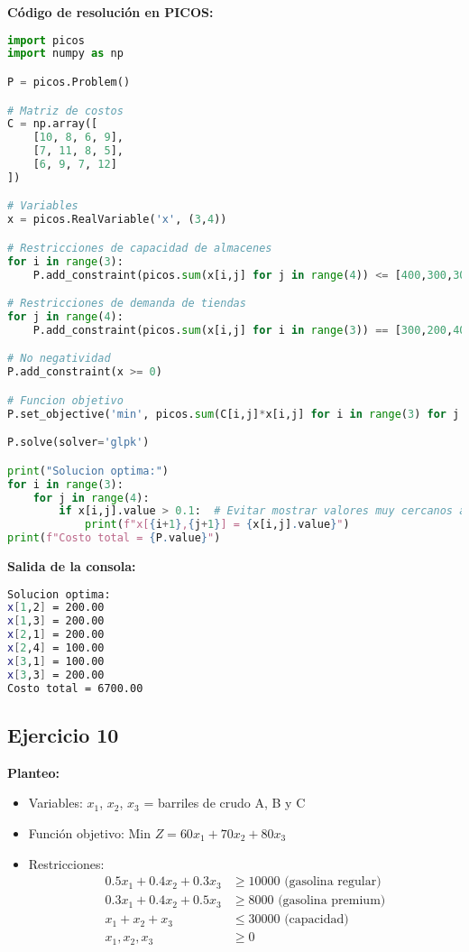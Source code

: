 \documentclass[12pt]{article}
\begin{document}
\textbf{Código de resolución en PICOS:}
\begin{lstlisting}[language=Python]
import picos
import numpy as np

P = picos.Problem()

# Matriz de costos
C = np.array([
    [10, 8, 6, 9],
    [7, 11, 8, 5],
    [6, 9, 7, 12]
])

# Variables
x = picos.RealVariable('x', (3,4))

# Restricciones de capacidad de almacenes
for i in range(3):
    P.add_constraint(picos.sum(x[i,j] for j in range(4)) <= [400,300,300][i])

# Restricciones de demanda de tiendas
for j in range(4):
    P.add_constraint(picos.sum(x[i,j] for i in range(3)) == [300,200,400,100][j])

# No negatividad
P.add_constraint(x >= 0)

# Funcion objetivo
P.set_objective('min', picos.sum(C[i,j]*x[i,j] for i in range(3) for j in range(4)))

P.solve(solver='glpk')

print("Solucion optima:")
for i in range(3):
    for j in range(4):
        if x[i,j].value > 0.1:  # Evitar mostrar valores muy cercanos a cero
            print(f"x[{i+1},{j+1}] = {x[i,j].value}")
print(f"Costo total = {P.value}")
\end{lstlisting}

\textbf{Salida de la consola:}
\begin{lstlisting}[language=bash,backgroundcolor=\color{black},basicstyle=\color{white}\ttfamily,numbers=none]
Solucion optima:
x[1,2] = 200.00
x[1,3] = 200.00
x[2,1] = 200.00
x[2,4] = 100.00
x[3,1] = 100.00
x[3,3] = 200.00
Costo total = 6700.00
\end{lstlisting}

\subsection*{Ejercicio 10}

\textbf{Planteo:}
\begin{itemize}
\item Variables: $x_1$, $x_2$, $x_3$ = barriles de crudo A, B y C
\item Función objetivo: Min $Z = 60x_1 + 70x_2 + 80x_3$
\item Restricciones:
  \begin{align*}
  0.5x_1 + 0.4x_2 + 0.3x_3 &\geq 10000 \text{ (gasolina regular)} \\
  0.3x_1 + 0.4x_2 + 0.5x_3 &\geq 8000 \text{ (gasolina premium)} \\
  x_1 + x_2 + x_3 &\leq 30000 \text{ (capacidad)} \\
  x_1, x_2, x_3 &\geq 0
  \end{align*}
\end{itemize}
\end{document}

